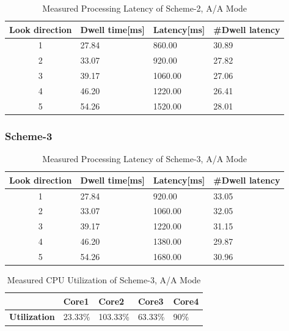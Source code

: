 \begin{table}[h!]
	\centering
	\begin{tabular}{|c|l|l|l|} 
	 \hline
	 \textbf{Look direction} & \textbf{Dwell time[ms]} & \textbf{Latency[ms]} & \textbf{\#Dwell latency} \\
	 \hline
	 1 & 27.84 & 860.00 & 30.89 \\ \hline
	 2 & 33.07 & 920.00 & 27.82 \\ \hline
	 3 & 39.17 & 1060.00 & 27.06 \\ \hline
	 4 & 46.20 & 1220.00 & 26.41 \\ \hline
	 5 & 54.26 & 1520.00 & 28.01 \\ \hline
	\end{tabular}
	\caption{Measured Processing Latency of Scheme-2, A/A Mode}
	\label{tbl:mm:scheme2_true_latency}
\end{table}

\FloatBarrier
\subsubsection{Scheme-3}
\begin{table}[h!]
	\centering
	\begin{tabular}{|c|l|l|l|} 
	 \hline
	 \textbf{Look direction} & \textbf{Dwell time[ms]} & \textbf{Latency[ms]} & \textbf{\#Dwell latency} \\
	 \hline
	 1 & 27.84 & 920.00 & 33.05 \\ \hline
	 2 & 33.07 & 1060.00 & 32.05 \\ \hline
	 3 & 39.17 & 1220.00 & 31.15 \\ \hline
	 4 & 46.20 & 1380.00 & 29.87 \\ \hline
	 5 & 54.26 & 1680.00 & 30.96 \\ \hline
	\end{tabular}
	\caption{Measured Processing Latency of Scheme-3, A/A Mode}
	\label{tbl:mm:scheme3_true_latency}
\end{table}

\begin{table}[h!]
	\centering
	\begin{tabular}{|l|l|l|l|l|} 
	 \hline
	& \textbf{Core1} & \textbf{Core2} & \textbf{Core3} & \textbf{Core4} \\ \hline
	\textbf{Utilization} & 23.33\% & {\color{red} 103.33\%} & 63.33\% & 90\% \\ \hline
	\end{tabular}
	\caption{Measured CPU Utilization of Scheme-3, A/A Mode}
	\label{tbl:mm:scheme3_true_util}
\end{table}
\FloatBarrier


